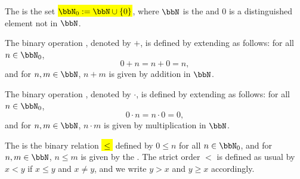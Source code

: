 \begin{definition} \label{definition:natural_numbers_with_zero}
    The  is the set \hl{$\bbN_0 := \bbN \cup \{0\}$}, where $\bbN$ is the  and $0$ is a distinguished element not in $\bbN$.

    The binary operation , denoted by $+$, is defined by extending  as follows: for all $n \in \bbN_0$,
    $$0 + n = n + 0 = n,$$
    and for $n, m \in \bbN$, $n + m$ is given by addition in $\bbN$.

    The binary operation , denoted by $\cdot$, is defined by extending  as follows: for all $n \in \bbN_0$,
    $$0 \cdot n = n \cdot 0 = 0,$$
    and for $n, m \in \bbN$, $n \cdot m$ is given by multiplication in $\bbN$.

    The  is the binary relation \hl{$\leq$} defined by $0 \leq n$ for all $n \in \bbN_0$, and for $n, m \in \bbN$, $n \leq m$ is given by the . The strict order $<$ is defined as usual by $x < y$ if $x \leq y$ and $x \neq y$, and we write $y > x$ and $y \geq x$ accordingly.
\end{definition}